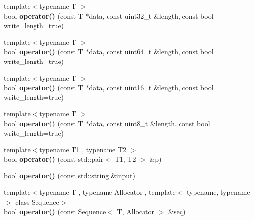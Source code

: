 \begin{DoxyCompactItemize}
\item 
\hypertarget{classstrtk_1_1binary_1_1writer_aa7d1f1a34bf641ea98b581a5f9974f8c}{{\footnotesize template$<$typename T $>$ }\\bool {\bfseries operator()} (const T $\ast$data, const uint32\-\_\-t \&length, const bool write\-\_\-length=true)}\label{classstrtk_1_1binary_1_1writer_aa7d1f1a34bf641ea98b581a5f9974f8c}

\item 
\hypertarget{classstrtk_1_1binary_1_1writer_a51d6ed607d4a4f1dde3eb16a8cefd46d}{{\footnotesize template$<$typename T $>$ }\\bool {\bfseries operator()} (const T $\ast$data, const uint64\-\_\-t \&length, const bool write\-\_\-length=true)}\label{classstrtk_1_1binary_1_1writer_a51d6ed607d4a4f1dde3eb16a8cefd46d}

\item 
\hypertarget{classstrtk_1_1binary_1_1writer_a9da364b29678f9412c64c5aa4493f69e}{{\footnotesize template$<$typename T $>$ }\\bool {\bfseries operator()} (const T $\ast$data, const uint16\-\_\-t \&length, const bool write\-\_\-length=true)}\label{classstrtk_1_1binary_1_1writer_a9da364b29678f9412c64c5aa4493f69e}

\item 
\hypertarget{classstrtk_1_1binary_1_1writer_af2f8c46af202989375749b032f7bfe71}{{\footnotesize template$<$typename T $>$ }\\bool {\bfseries operator()} (const T $\ast$data, const uint8\-\_\-t \&length, const bool write\-\_\-length=true)}\label{classstrtk_1_1binary_1_1writer_af2f8c46af202989375749b032f7bfe71}

\item 
\hypertarget{classstrtk_1_1binary_1_1writer_a22d7b05dee0d5d01a0b434d0b9ff00d0}{{\footnotesize template$<$typename T1 , typename T2 $>$ }\\bool {\bfseries operator()} (const std\-::pair$<$ T1, T2 $>$ \&p)}\label{classstrtk_1_1binary_1_1writer_a22d7b05dee0d5d01a0b434d0b9ff00d0}

\item 
\hypertarget{classstrtk_1_1binary_1_1writer_a26a65d318dfdf850df206fd61f010c68}{bool {\bfseries operator()} (const std\-::string \&input)}\label{classstrtk_1_1binary_1_1writer_a26a65d318dfdf850df206fd61f010c68}

\item 
\hypertarget{classstrtk_1_1binary_1_1writer_a6b9a32820d91f5aa66354047f45c755f}{{\footnotesize template$<$typename T , typename Allocator , template$<$ typename, typename $>$ class Sequence$>$ }\\bool {\bfseries operator()} (const Sequence$<$ T, Allocator $>$ \&seq)}\label{classstrtk_1_1binary_1_1writer_a6b9a32820d91f5aa66354047f45c755f}


\end{DoxyCompactItemize}
